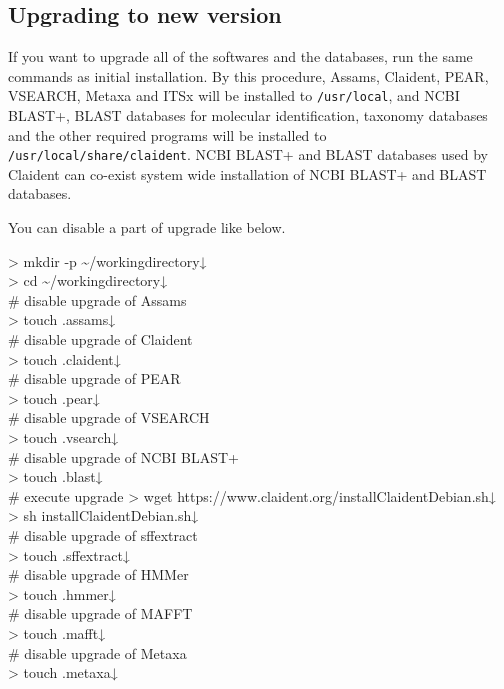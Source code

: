 \documentclass[titlepage,10pt,a4paper,english]{jsbook}
\newenvironment{cmd}{\begin{oframed}\raggedright\ttfamily\footnotesize\setlength{\baselineskip}{1.4em}}{\end{oframed}\vspace{-1em}}
\begin{document}
\subsection{Upgrading to new version}

If you want to upgrade all of the softwares and the databases, run the same commands as initial installation.
By this procedure, Assams, Claident, PEAR, VSEARCH, Metaxa and ITSx will be installed to \texttt{/usr/local}, and NCBI BLAST+, BLAST databases for molecular identification, taxonomy databases and the other required programs will be installed to \texttt{/usr/local/share/claident}.
NCBI BLAST+ and BLAST databases used by Claident can co-exist system wide installation of NCBI BLAST+ and BLAST databases.

You can disable a part of upgrade like below.
\begin{cmd}
{\textgreater} mkdir -p {\textasciitilde}/workingdirectory↓\\
{\textgreater} cd {\textasciitilde}/workingdirectory↓\\
\# disable upgrade of Assams\\
{\textgreater} touch .assams↓\\
\# disable upgrade of Claident\\
{\textgreater} touch .claident↓\\
\# disable upgrade of PEAR\\
{\textgreater} touch .pear↓\\
\# disable upgrade of VSEARCH\\
{\textgreater} touch .vsearch↓\\
\# disable upgrade of NCBI BLAST+\\
{\textgreater} touch .blast↓\\
\# execute upgrade
{\textgreater} wget https://www.claident.org/installClaident{\textunderscore}Debian.sh↓\\
{\textgreater} sh installClaident{\textunderscore}Debian.sh↓\\
\# disable upgrade of sff{\textunderscore}extract\\
{\textgreater} touch .sffextract↓\\
\# disable upgrade of HMMer\\
{\textgreater} touch .hmmer↓\\
\# disable upgrade of MAFFT\\
{\textgreater} touch .mafft↓\\
\# disable upgrade of Metaxa\\
{\textgreater} touch .metaxa↓\\

\end{cmd}
\end{document}
